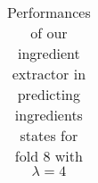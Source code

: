 \documentclass{article}
\begin{document}
\begin{table}
\begin{center}
\begin{tabular}{| l | l | l | l | l | l | l | l | l |}
    \end{tabular}
    \label{tab:tab10}
\end{center}
\caption{Performances of our ingredient extractor in predicting ingredients states for fold 8 with $\lambda = 4$}
\end{table}
\end{document}
